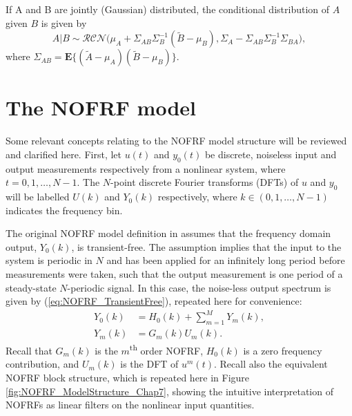 \begin{property}
\label{prop:CondDist}
If A and B are jointly (Gaussian) distributed, the conditional distribution of $A$ given $B$ is given by
\begin{equation}
A|B \sim \mathcal{RCN}\big(\mu_A + \Sigma_{AB} \Sigma_B^{-1}(\widetilde{B}-\mu_B),\Sigma_A - \Sigma_{AB} \Sigma_B^{-1} \Sigma_{BA} \big),
\end{equation}
where $\Sigma_{AB} = \textbf{E} \{ (\widetilde{A}-\mu_A)(\widetilde{B}-\mu_B) \}$. 
\end{property}

\section{The NOFRF model}

Some relevant concepts relating to the NOFRF model structure will be reviewed and clarified here. First, let $u(t)$ and $y_0(t)$ be discrete, noiseless input and output measurements respectively from a nonlinear system, where $t = 0,1,\hdots,N-1$. The $N$-point discrete Fourier transforms (DFTs) of $u$ and $y_0$ will be labelled $U(k)$ and $Y_0(k)$ respectively, where $k \in (0,1,\hdots,N-1)$ indicates the frequency bin. 

The original NOFRF model definition in \cite{Lang2005} assumes that the frequency domain output, $Y_0(k)$, is transient-free. The assumption implies that the input to the system is periodic in $N$ and has been applied for an infinitely long period before measurements were taken, such that the output measurement is one period of a steady-state $N$-periodic signal. In this case, the noise-less output spectrum is given by (\ref{eq:NOFRF_TransientFree}), repeated here for convenience:
\begin{equation}
\begin{split}
Y_0(k) &= H_0(k) + \sum_{m=1}^{M} Y_m(k), \\
Y_m(k) &= G_m(k) U_m(k).  \label{eq:NOFRF_TransientFree_Chap7}
\end{split}
\end{equation}
Recall that $G_m(k)$ is the $m$\textsuperscript{th} order NOFRF, $H_0(k)$ is a zero frequency contribution, and $U_m(k)$ is the DFT of $u^m(t)$. Recall also the equivalent NOFRF block structure, which is repeated here in Figure \ref{fig:NOFRF_ModelStructure_Chap7}, showing the intuitive interpretation of NOFRFs as linear filters on the nonlinear input quantities.

